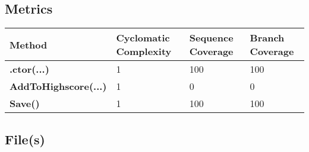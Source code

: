 \documentclass[a4paper,10pt]{article}
\begin{document}
\subsection{Metrics}
\begin{longtable}[l]{|l|l|l|l|}
\hline
\textbf{Method} & \textbf{Cyclomatic Complexity} & \textbf{Sequence Coverage} & \textbf{Branch Coverage}\\
\hline
\textbf{.ctor(...)} & 1 & 100 & 100\\
\hline
\textbf{AddToHighscore(...)} & 1 & 0 & 0\\
\hline
\textbf{Save()} & 1 & 100 & 100\\
\hline
\end{longtable}
\subsection{File(s)}
\end{document}
